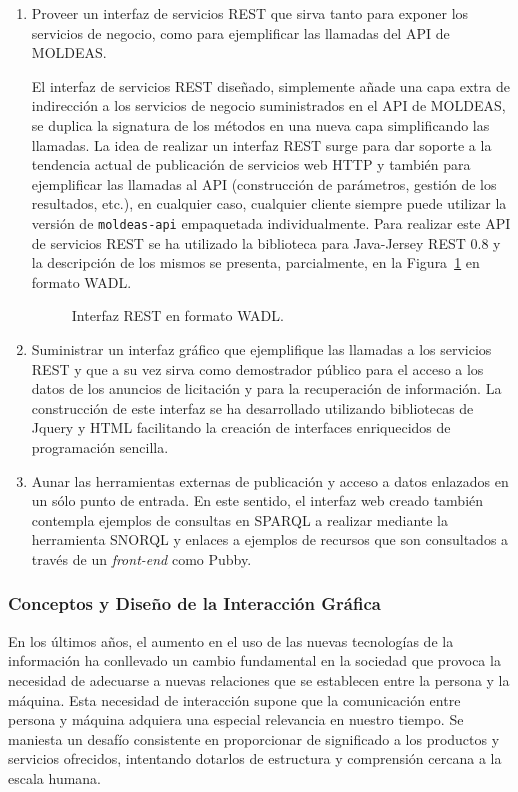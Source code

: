 \begin{enumerate}
\item Proveer un interfaz de servicios \gls{REST} que sirva tanto para exponer los 
servicios de negocio, como para ejemplificar las llamadas del \gls{API} de MOLDEAS.

El interfaz de servicios REST diseñado, simplemente añade una capa extra de indirección a los 
servicios de negocio suministrados en el API de MOLDEAS, se duplica la signatura de los métodos 
en una nueva capa simplificando las llamadas. La idea de realizar un interfaz REST surge para dar soporte a la tendencia actual de publicación 
de servicios web \gls{HTTP} y también para ejemplificar las llamadas al API (construcción de parámetros, gestión 
de los resultados, etc.), en cualquier caso, cualquier cliente siempre puede utilizar 
la versión de \texttt{moldeas-api} empaquetada individualmente. Para realizar este API de servicios 
REST se ha utilizado la biblioteca para Java-Jersey \gls{REST} 0.8 y la descripción de los mismos 
se presenta, parcialmente, en la Figura~\ref{fig:moldeas-wadl} en formato \gls{WADL}.


\begin{figure}[!htp]

	\caption{Interfaz REST en formato WADL.}
	\label{fig:moldeas-wadl}
\end{figure}


\item Suministrar un interfaz gráfico que ejemplifique las llamadas a los servicios REST y que a su vez sirva como demostrador público para el acceso a los datos de los anuncios de licitación 
y para la recuperación de información. La construcción de este interfaz se ha desarrollado utilizando 
bibliotecas de Jquery y HTML facilitando la creación de interfaces enriquecidos de programación 
sencilla.

\item Aunar las herramientas externas de publicación y acceso a datos enlazados en un sólo punto de entrada. En este sentido, 
el interfaz web creado también contempla ejemplos de consultas en SPARQL a realizar mediante la herramienta 
\gls{SNORQL} y enlaces a ejemplos de recursos que son consultados a través de un \linkeddata \textit{front-end} como 
Pubby.
\end{enumerate}

\subsubsection{Conceptos y Diseño de la Interacción Gráfica}
En los últimos años, el aumento en el uso de las nuevas tecnologías de la información ha 
conllevado un cambio fundamental en la sociedad que provoca la necesidad de adecuarse a nuevas 
relaciones que se establecen entre la persona y la máquina. Esta necesidad de interacción supone 
que la comunicación entre persona y máquina adquiera una especial relevancia en nuestro tiempo. Se maniesta
 un desafío consistente en proporcionar de significado a los productos y servicios ofrecidos, 
intentando dotarlos de estructura y comprensión cercana a la escala humana.

